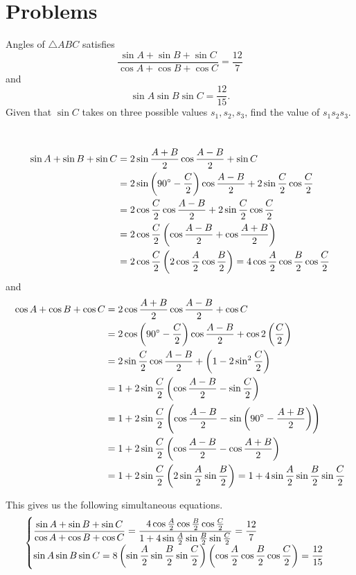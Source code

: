 \section*{Problems}
\begin{prbm}
Angles of $\triangle ABC$ satisfies
\[ \frac{\sin A+\sin B+\sin C}{\cos A+\cos B+\cos C}=\frac{12}{7} \]
and
\[ \sin A\sin B\sin C=\frac{12}{15}. \]
Given that $\sin C$ takes on three possible values $s_1,s_2,s_3$, find the value of $s_1s_2s_3$.
\end{prbm}
\begin{solution} \
\begin{align*}
\sin A+\sin B+\sin C
&= 2\sin\frac{A+B}{2}\cos\frac{A-B}{2}+\sin C \\
&= 2\sin\left(90\degree-\frac{C}{2}\right)\cos\frac{A-B}{2}+2\sin\frac{C}{2}\cos\frac{C}{2} \\
&= 2\cos\frac{C}{2}\cos\frac{A-B}{2}+2\sin\frac{C}{2}\cos\frac{C}{2} \\
&= 2\cos\frac{C}{2}\left(\cos\frac{A-B}{2}+\cos\frac{A+B}{2}\right) \\
&= 2\cos\frac{C}{2}\left(2\cos\frac{A}{2}\cos\frac{B}{2}\right) 
= 4\cos\frac{A}{2}\cos\frac{B}{2}\cos\frac{C}{2}
\end{align*}
and
\begin{align*}
\cos A+\cos B+\cos C
&= 2\cos\frac{A+B}{2}\cos\frac{A-B}{2}+\cos C \\
&= 2\cos\left(90\degree-\frac{C}{2}\right)\cos\frac{A-B}{2}+\cos2\left(\frac{C}{2}\right) \\
&= 2\sin\frac{C}{2}\cos\frac{A-B}{2}+\left(1-2\sin^2\frac{C}{2}\right) \\
&= 1+2\sin\frac{C}{2}\left(\cos\frac{A-B}{2}-\sin\frac{C}{2}\right) \\
&= 1+2\sin\frac{C}{2}\left(\cos\frac{A-B}{2}-\sin\left(90\degree-\frac{A+B}{2}\right)\right) \\
&= 1+2\sin\frac{C}{2}\left(\cos\frac{A-B}{2}-\cos\frac{A+B}{2}\right) \\
&= 1+2\sin\frac{C}{2}\left(2\sin\frac{A}{2}\sin\frac{B}{2}\right) 
= 1+4\sin\frac{A}{2}\sin\frac{B}{2}\sin\frac{C}{2}
\end{align*}

This gives us the following simultaneous equations.
\[ \begin{cases}
\dfrac{\sin A+\sin B+\sin C}{\cos A+\cos B+\cos C} = \dfrac{4\cos\frac{A}{2}\cos\frac{B}{2}\cos\frac{C}{2}}{1+4\sin\frac{A}{2}\sin\frac{B}{2}\sin\frac{C}{2}} = \dfrac{12}{7} \\
\sin A\sin B\sin C = 8\left(\sin\dfrac{A}{2}\sin\dfrac{B}{2}\sin\dfrac{C}{2}\right)\left(\cos\dfrac{A}{2}\cos\dfrac{B}{2}\cos\dfrac{C}{2}\right) = \dfrac{12}{15}
\end{cases} \]


\end{solution}
